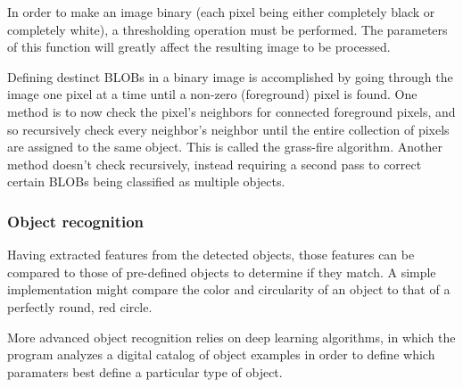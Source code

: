 			In order to make an image binary (each pixel being either completely black or completely white), a thresholding operation must be performed. The parameters of this function will greatly affect the resulting image to be processed. 
			
			Defining destinct BLOBs in a binary image is accomplished by going through the image one pixel at a time until a non-zero (foreground) pixel is found. One method is to now check the pixel's neighbors for connected foreground pixels, and so recursively check every neighbor's neighbor until the entire collection of pixels are assigned to the same object. This is called the grass-fire algorithm. Another method doesn't check recursively, instead requiring a second pass to correct certain BLOBs being classified as multiple objects.
			
			
			\subsubsection{Object recognition}
				Having extracted features from the detected objects, those features can be compared to those of pre-defined objects to determine if they match. A simple implementation might compare the color and circularity of an object to that of a perfectly round, red circle. 
				
				More advanced object recognition relies on deep learning algorithms, in which the program analyzes a digital catalog of object examples in order to define which paramaters best define a particular type of object.
			
